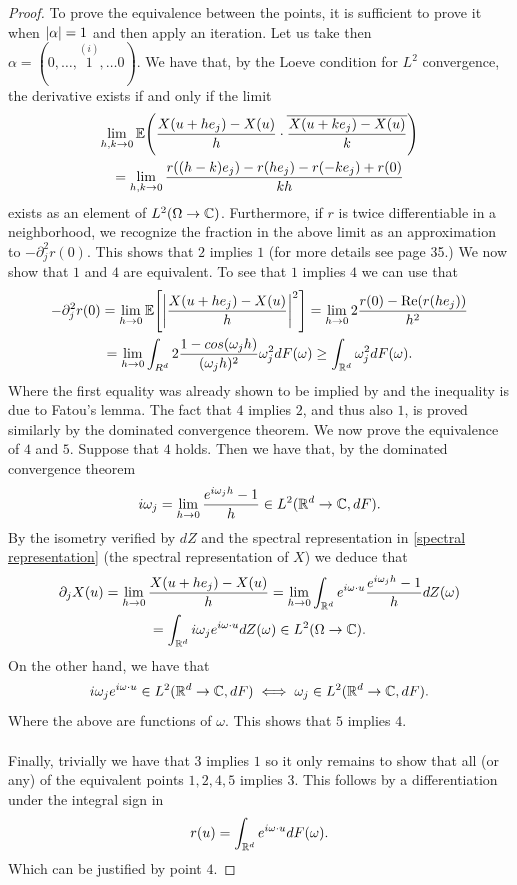 \documentclass[
    a4paper,
    DIV=14,
    abstract=true,
    numbers=noenddot
]{scrartcl}
\begin{document}
\begin{proof}
	To prove the equivalence between the points, it is sufficient to prove it when $\left| \alpha \right|=1$ and then apply an iteration. Let us take then\\ $\alpha=(0,\ldots,\overset{(i)}{1},\ldots 0)$. We have that, by the Loeve condition for $L^2$ convergence, the derivative exists if and only if the limit
	\begin{multline*}
		\lim_{h,k \to 0}\mathbb{E}\qty(\frac{X(u+he_j)-X(u)}{h}\cdot\overline{\frac{X(u+ke_j)-X(u)}{k}})\\=
		\lim_{h,k \to 0}\frac{r((h-k)e_j)-r(he_j)-r(-ke_j)+r(0)}{kh}
	\end{multline*}
	exists as an element of $L^2(\Omega\to\mathbb{C})$. Furthermore, if $r$ is twice differentiable in a neighborhood, we recognize the fraction in the above limit as an approximation to $-\partial_j^2r(0)$. This shows that $2$ implies  $1$ (for more details see \cite{lindgren2012stationary} page 35.) We now show that $1$ and $4$ are equivalent. To see that $1$ implies  $4$ we can use that
	\begin{multline*}
		-\partial_j^2 r(0)=\lim_{h \to 0}\mathbb{E}\qty[\left| \frac{X(u+he_j)-X(u)}{h} \right|^2]=\lim_{h \to 0}2\frac{r(0)-\Re(r(he_j))}{h^2}\\=\lim_{h\to 0}
		\int_{R^d}2\frac{1-cos(\omega_j h)}{(\omega_jh)^2}\omega_j^2dF(\omega)\geq\int_{\mathbb{R}^d}\omega_j^2dF(\omega).
	\end{multline*}
	Where the first equality was already shown to be implied by  and the inequality is due to Fatou's lemma. The fact that $4$ implies $2$, and thus also $1$, is proved similarly by the dominated convergence theorem.  We now prove the equivalence of $4$ and $5$. Suppose that  $4$ holds. Then we have  that, by the dominated convergence theorem
	\begin{equation*}
		i\omega_j=\lim_{h\to 0}\frac{e^{i\omega_j h}-1}{h}\in L^2(\mathbb{R}^d\to\mathbb{C},dF).
	\end{equation*}
	By the isometry verified by $dZ$  and the spectral representation in \eqref{spectral representation} (the spectral representation of $X$)   we deduce that
	\begin{multline*}
		\partial_j X(u)=\lim_{h \to 0}\frac{X(u+he_j)-X(u)}{h}=\lim_{h \to 0}\int_{\mathbb{R}^d}e^{i\omega\cdot u} \frac{e^{i\omega_j h}-1}{h} dZ(\omega)\\
		=\int_{\mathbb{R}^d}i\omega_j e^{i\omega\cdot u}dZ(\omega)\in L^2(\Omega\to\mathbb{C}).
	\end{multline*}
	On the other hand, we have that $$i\omega_je^{i\omega\cdot u}\in L^2(\mathbb{R}^d\to\mathbb{C},dF)\iff\omega_j\in L^2(\mathbb{R}^d\to\mathbb{C},dF).$$
	Where the above are functions of $\omega$. This shows that $5$ implies $4$.
	\\
	\\
	Finally, trivially we have that $3$ implies $1$ so it only remains to show that all (or any) of the equivalent points $1,2,4,5$ implies $3$. This follows by a differentiation under the integral sign in
	\begin{equation*}
		r(u)=\int_{\mathbb{R}^d}e^{i\omega\cdot u}dF(\omega).
	\end{equation*}
	Which can be justified by point $4$.
\end{proof}
\end{document}
